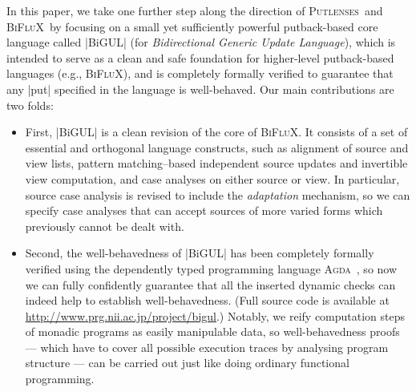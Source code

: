 \documentclass[fleqn]{llncs}
\renewcommand{\emph}{\textsl}
\newcommand{\BiGUL}{\textsc{BiGUL}}
\newcommand{\Putlenses}{\textsc{Putlenses}}
\newcommand{\BiFluX}{\textsc{BiFluX}}
\newcommand{\Agda}{\textsc{Agda}}
\begin{document}
In this paper, we take one further step along the direction of \Putlenses\ and \BiFluX\ by focusing on a small yet sufficiently powerful putback-based core language called |BiGUL| (for \emph{Bidirectional Generic Update Language}),
which is intended to serve as a clean and safe foundation for higher-level putback-based languages (e.g., \BiFluX),
and is completely formally verified to guarantee that any |put| specified in the language is well-behaved.
Our main contributions are two folds:
\begin{itemize}
\item First, |BiGUL| is a clean revision of the core of \BiFluX.
It consists of a set of essential and orthogonal language constructs, such as 
alignment of source and view lists, pattern matching--based independent source updates and invertible view computation, and case analyses on either source or view.
In particular, source case analysis is revised to include the {\em adaptation} mechanism, so we can specify case analyses that can accept sources of more varied forms which previously cannot be dealt with.

\item Second, the well-behavedness of |BiGUL| has been completely formally verified using the dependently typed programming language \Agda~\cite{Norell-thesis,Nore08}, so now we can fully confidently guarantee that all the inserted dynamic checks can indeed help to establish well-behavedness.
(Full source code is available at \url{http://www.prg.nii.ac.jp/project/bigul}.)
Notably, we reify computation steps of monadic programs as easily manipulable data, so well-behavedness proofs --- which have to cover all possible execution traces by analysing program structure --- can be carried out just like doing ordinary functional programming.
\end{itemize}
%

\end{document}
